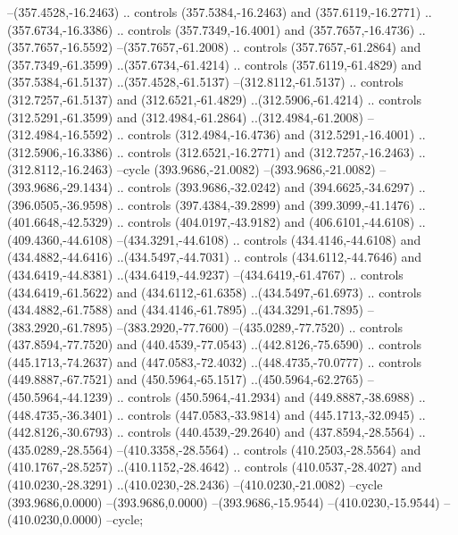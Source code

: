 \begin{scope}[shift={(55,462)}]
--(357.4528,-16.2463) .. controls (357.5384,-16.2463) and (357.6119,-16.2771) ..(357.6734,-16.3386) .. controls (357.7349,-16.4001) and (357.7657,-16.4736) ..(357.7657,-16.5592) --(357.7657,-61.2008) .. controls (357.7657,-61.2864) and (357.7349,-61.3599) ..(357.6734,-61.4214) .. controls (357.6119,-61.4829) and (357.5384,-61.5137) ..(357.4528,-61.5137) --(312.8112,-61.5137) .. controls (312.7257,-61.5137) and (312.6521,-61.4829) ..(312.5906,-61.4214) .. controls (312.5291,-61.3599) and (312.4984,-61.2864) ..(312.4984,-61.2008) --(312.4984,-16.5592) .. controls (312.4984,-16.4736) and (312.5291,-16.4001) ..(312.5906,-16.3386) .. controls (312.6521,-16.2771) and (312.7257,-16.2463) ..(312.8112,-16.2463) --cycle (393.9686,-21.0082) --(393.9686,-21.0082) --(393.9686,-29.1434) .. controls (393.9686,-32.0242) and (394.6625,-34.6297) ..(396.0505,-36.9598) .. controls (397.4384,-39.2899) and (399.3099,-41.1476) ..(401.6648,-42.5329) .. controls (404.0197,-43.9182) and (406.6101,-44.6108) ..(409.4360,-44.6108) --(434.3291,-44.6108) .. controls (434.4146,-44.6108) and (434.4882,-44.6416) ..(434.5497,-44.7031) .. controls (434.6112,-44.7646) and (434.6419,-44.8381) ..(434.6419,-44.9237) --(434.6419,-61.4767) .. controls (434.6419,-61.5622) and (434.6112,-61.6358) ..(434.5497,-61.6973) .. controls (434.4882,-61.7588) and (434.4146,-61.7895) ..(434.3291,-61.7895) --(383.2920,-61.7895) --(383.2920,-77.7600) --(435.0289,-77.7520) .. controls (437.8594,-77.7520) and (440.4539,-77.0543) ..(442.8126,-75.6590) .. controls (445.1713,-74.2637) and (447.0583,-72.4032) ..(448.4735,-70.0777) .. controls (449.8887,-67.7521) and (450.5964,-65.1517) ..(450.5964,-62.2765) --(450.5964,-44.1239) .. controls (450.5964,-41.2934) and (449.8887,-38.6988) ..(448.4735,-36.3401) .. controls (447.0583,-33.9814) and (445.1713,-32.0945) ..(442.8126,-30.6793) .. controls (440.4539,-29.2640) and (437.8594,-28.5564) ..(435.0289,-28.5564) --(410.3358,-28.5564) .. controls (410.2503,-28.5564) and (410.1767,-28.5257) ..(410.1152,-28.4642) .. controls (410.0537,-28.4027) and (410.0230,-28.3291) ..(410.0230,-28.2436) --(410.0230,-21.0082) --cycle (393.9686,0.0000) --(393.9686,0.0000) --(393.9686,-15.9544) --(410.0230,-15.9544) --(410.0230,0.0000) --cycle;

\end{scope}

